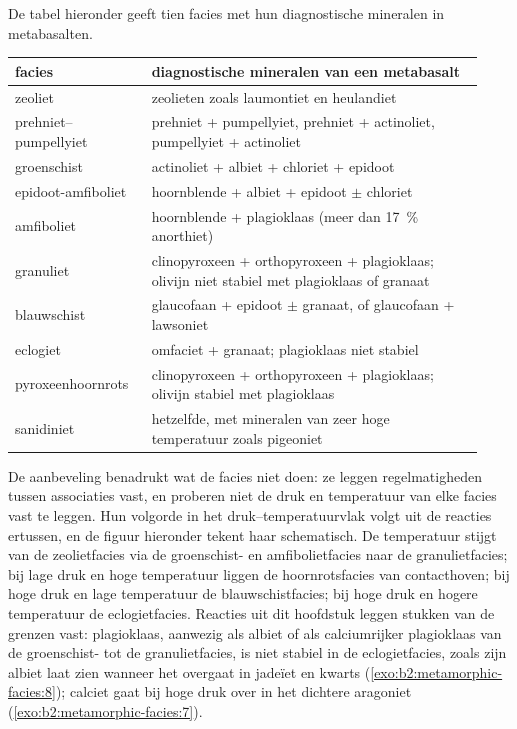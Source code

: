 De tabel hieronder geeft tien facies met hun diagnostische mineralen in metabasalten.

\begin{center}
\small
\begin{tabular}{@{}p{0.27\linewidth}p{0.66\linewidth}@{}}
\hline
facies & diagnostische mineralen van een metabasalt\\
\hline
zeoliet & zeolieten zoals laumontiet en heulandiet\\
prehniet--pumpellyiet & prehniet + pumpellyiet, prehniet + actinoliet, pumpellyiet + actinoliet\\
groenschist & actinoliet + albiet + chloriet + epidoot\\
epidoot-amfiboliet & hoornblende + albiet + epidoot $\pm$ chloriet\\
amfiboliet & hoornblende + plagioklaas (meer dan \qty{17}{\percent} anorthiet)\\
granuliet & clinopyroxeen + orthopyroxeen + plagioklaas; olivijn niet stabiel met plagioklaas of granaat\\
blauwschist & glaucofaan + epidoot $\pm$ granaat, of glaucofaan + lawsoniet\\
eclogiet & omfaciet + granaat; plagioklaas niet stabiel\\
pyroxeenhoornrots & clinopyroxeen + orthopyroxeen + plagioklaas; olivijn stabiel met plagioklaas\\
sanidiniet & hetzelfde, met mineralen van zeer hoge temperatuur zoals pigeoniet\\
\hline
\end{tabular}
\par{}
\end{center}

De aanbeveling benadrukt wat de facies niet doen: ze leggen regelmatigheden tussen
associaties vast, en proberen niet de druk en temperatuur van elke facies vast te leggen. Hun volgorde in
het druk--temperatuurvlak volgt uit de reacties ertussen, en de
figuur hieronder tekent haar schematisch. De temperatuur stijgt van de zeolietfacies via
de groenschist- en amfibolietfacies naar de granulietfacies; bij lage druk en hoge
temperatuur liggen de hoornrotsfacies van contacthoven; bij hoge druk en lage
temperatuur de blauwschistfacies; bij hoge druk en hogere temperatuur de
eclogietfacies. Reacties uit dit hoofdstuk leggen stukken van de grenzen vast: plagioklaas,
aanwezig als albiet of als calciumrijker plagioklaas van de groenschist- tot de
granulietfacies, is niet stabiel in de eclogietfacies, zoals zijn
albiet laat zien wanneer het overgaat in jadeïet en kwarts (\cref{exo:b2:metamorphic-facies:8}); calciet gaat bij hoge druk over in het
dichtere aragoniet (\cref{exo:b2:metamorphic-facies:7}).

